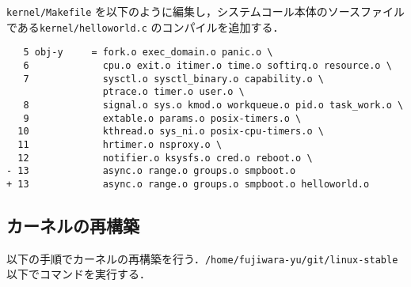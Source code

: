 \documentclass[12pt]{jsarticle}
\begin{document}
\begin{enumerate}
\verb|kernel/Makefile| を以下のように編集し，システムコール本体のソースファイルである\verb|kernel/helloworld.c| のコンパイルを追加する．
\begin{verbatim}
   5 obj-y     = fork.o exec_domain.o panic.o \
   6             cpu.o exit.o itimer.o time.o softirq.o resource.o \
   7             sysctl.o sysctl_binary.o capability.o \
                 ptrace.o timer.o user.o \
   8             signal.o sys.o kmod.o workqueue.o pid.o task_work.o \
   9             extable.o params.o posix-timers.o \
  10             kthread.o sys_ni.o posix-cpu-timers.o \
  11             hrtimer.o nsproxy.o \
  12             notifier.o ksysfs.o cred.o reboot.o \
- 13             async.o range.o groups.o smpboot.o
+ 13             async.o range.o groups.o smpboot.o helloworld.o
\end{verbatim}

\end{enumerate}

\subsection{カーネルの再構築}
以下の手順でカーネルの再構築を行う．\verb|/home/fujiwara-yu/git/linux-stable|以下でコマンドを実行する．
\end{document}
